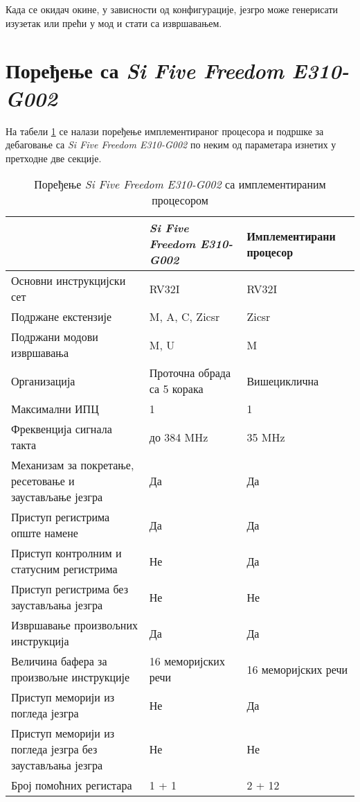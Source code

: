 Када се окидач окине, у зависности од конфигурације, језгро може генерисати изузетак или прећи у  мод и стати са извршавањем.

\section{Поређење са \textit{Si Five Freedom E310-G002}}

На табели \ref{table:comp} се налази поређење имплементираног процесора и подршке за дебаговање са \textit{Si Five Freedom E310-G002}\cite{hifive_manual} по неким од параметара изнетих у претходне две секције.

\begin{table}[h!]
	\centering
	\caption{Поређење \textit{Si Five Freedom E310-G002} са имплементираним процесором}
	\label{table:comp}
	\begin{tabular}{|p{5.5cm}|l|l|} 
		\hline \rowcolor{lightgray} & \textit{Si Five Freedom E310-G002} & Имплементирани процесор \\
		\hline Основни инструкцијски сет & RV32I & RV32I \\
		\hline Подржане екстензије & M, A, C, Zicsr & Zicsr \\
		\hline Подржани модови извршавања & M, U & M \\
		\hline Организација & Проточна обрада са 5 корака & Вишециклична \\
		\hline Максимални \acrshort{ИПЦ}\footnotemark & 1 & 1 \\
		\hline Фреквенција сигнала такта & до 384 MHz & 35 MHz \\
		\hline Механизам за покретање, ресетовање и заустављање језгра & Да & Да \\
		\hline Приступ регистрима опште намене & Да & Да \\
		\hline Приступ контролним и статусним регистрима & Не & Да \\
		\hline Приступ регистрима без заустављања језгра & Не & Не \\
		\hline Извршавање произвољних инструкција & Да & Да \\
		\hline Величина бафера за произвољне инструкције & 16 меморијских речи & 16 меморијских речи \\
		\hline Приступ меморији из погледа језгра & Не & Да \\
		\hline Приступ меморији из погледа језгра без заустављања језгра & Не & Не \\
		\hline Број помоћних регистара\footnotemark & 1 + 1 & 2 + 12 \\

\end{tabular}
\end{table}
